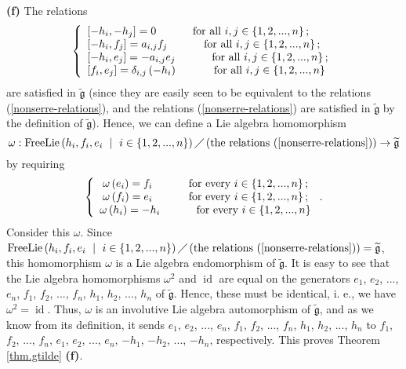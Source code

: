 \documentclass[etingof-lie.tex]{subfiles}
\begin{document}
\bigskip

\begin{vershort}
\textbf{(f)} The relations%
\[
\left\{
\begin{array}
[c]{l}%
\left[  -h_{i},-h_{j}\right]  =0\ \ \ \ \ \ \ \ \ \ \text{for all }%
i,j\in\left\{  1,2,...,n\right\}  ;\\
\left[  -h_{i},f_{j}\right]  =a_{i,j}f_{j}\ \ \ \ \ \ \ \ \ \ \text{for all
}i,j\in\left\{  1,2,...,n\right\}  ;\\
\left[  -h_{i},e_{j}\right]  =-a_{i,j}e_{j}\ \ \ \ \ \ \ \ \ \ \text{for all
}i,j\in\left\{  1,2,...,n\right\}  ;\\
\left[  f_{i},e_{j}\right]  =\delta_{i,j}\left(  -h_{i}\right)
\ \ \ \ \ \ \ \ \ \ \text{for all }i,j\in\left\{  1,2,...,n\right\}
\end{array}
\right.
\]
are satisfied in $\widetilde{\mathfrak{g}}$ (since they are easily seen to be
equivalent to the relations (\ref{nonserre-relations}), and the relations
(\ref{nonserre-relations}) are satisfied in $\widetilde{\mathfrak{g}}$ by the
definition of $\widetilde{\mathfrak{g}}$). Hence, we can define a Lie algebra
homomorphism
\[
\omega:\operatorname*{FreeLie}\left(  h_{i},f_{i},e_{i}\ \mid\ i\in\left\{
1,2,...,n\right\}  \right)  \diagup\left(  \text{the relations
(\ref{nonserre-relations})}\right)  \rightarrow\widetilde{\mathfrak{g}}%
\]
by requiring%
\[
\left\{
\begin{array}
[c]{c}%
\omega\left(  e_{i}\right)  =f_{i}\ \ \ \ \ \ \ \ \ \ \text{for every }%
i\in\left\{  1,2,...,n\right\}  ;\\
\omega\left(  f_{i}\right)  =e_{i}\ \ \ \ \ \ \ \ \ \ \text{for every }%
i\in\left\{  1,2,...,n\right\}  ;\\
\omega\left(  h_{i}\right)  =-h_{i}\ \ \ \ \ \ \ \ \ \ \text{for every }%
i\in\left\{  1,2,...,n\right\}
\end{array}
\right.  .
\]
Consider this $\omega$. Since $\operatorname*{FreeLie}\left(  h_{i}%
,f_{i},e_{i}\ \mid\ i\in\left\{  1,2,...,n\right\}  \right)  \diagup\left(
\text{the relations (\ref{nonserre-relations})}\right)
=\widetilde{\mathfrak{g}}$, this homomorphism $\omega$ is a Lie algebra
endomorphism of $\widetilde{\mathfrak{g}}$. It is easy to see that the Lie
algebra homomorphisms $\omega^{2}$ and $\operatorname*{id}$ are equal on the
generators $e_{1}$, $e_{2}$, $...$, $e_{n}$, $f_{1}$, $f_{2}$, $...$, $f_{n}$,
$h_{1}$, $h_{2}$, $...$, $h_{n}$ of $\widetilde{\mathfrak{g}}$. Hence, these
must be identical, i. e., we have $\omega^{2}=\operatorname*{id}$. Thus,
$\omega$ is an involutive Lie algebra automorphism of $\widetilde{\mathfrak{g}%
}$, and as we know from its definition, it sends $e_{1}$, $e_{2}$, $...$,
$e_{n}$, $f_{1}$, $f_{2}$, $...$, $f_{n}$, $h_{1}$, $h_{2}$, $...$, $h_{n}$ to
$f_{1}$, $f_{2}$, $...$, $f_{n}$, $e_{1}$, $e_{2}$, $...$, $e_{n}$, $-h_{1}$,
$-h_{2}$, $...$, $-h_{n}$, respectively. This proves Theorem \ref{thm.gtilde}
\textbf{(f)}.
\end{vershort}
\end{document}
